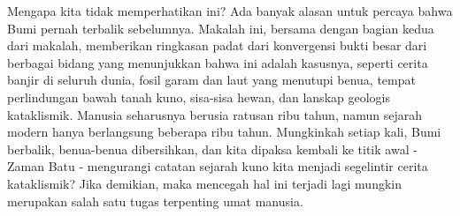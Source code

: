 \documentclass[10pt,twocolumn,letterpaper]{article}
\begin{document}
Mengapa kita tidak memperhatikan ini? Ada banyak alasan untuk percaya bahwa Bumi pernah terbalik sebelumnya. Makalah ini, bersama dengan bagian kedua dari makalah, memberikan ringkasan padat dari konvergensi bukti besar dari berbagai bidang yang menunjukkan bahwa ini adalah kasusnya, seperti cerita banjir di seluruh dunia, fosil garam dan laut yang menutupi benua, tempat perlindungan bawah tanah kuno, sisa-sisa hewan, dan lanskap geologis kataklismik. Manusia seharusnya berusia ratusan ribu tahun, namun sejarah modern hanya berlangsung beberapa ribu tahun. Mungkinkah setiap kali, Bumi berbalik, benua-benua dibersihkan, dan kita dipaksa kembali ke titik awal - Zaman Batu - mengurangi catatan sejarah kuno kita menjadi segelintir cerita kataklismik? Jika demikian, maka mencegah hal ini terjadi lagi mungkin merupakan salah satu tugas terpenting umat manusia.
\end{document}
